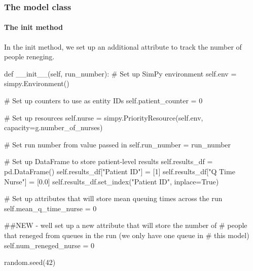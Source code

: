 \documentclass[
  letterpaper,
  DIV=11,
  numbers=noendperiod]{scrreprt}
\let\oldparagraph\paragraph
\renewcommand{\paragraph}[1]{\oldparagraph{#1}\mbox{}}
\newenvironment{Shaded}{}{}
\newcommand{\CommentTok}[1]{\textcolor[rgb]{0.42,0.45,0.49}{#1}}
\newcommand{\DecValTok}[1]{\textcolor[rgb]{0.00,0.36,0.77}{#1}}
\newcommand{\FloatTok}[1]{\textcolor[rgb]{0.00,0.36,0.77}{#1}}
\newcommand{\FunctionTok}[1]{\textcolor[rgb]{0.44,0.26,0.76}{#1}}
\newcommand{\KeywordTok}[1]{\textcolor[rgb]{0.84,0.23,0.29}{#1}}
\newcommand{\NormalTok}[1]{\textcolor[rgb]{0.14,0.16,0.18}{#1}}
\newcommand{\OperatorTok}[1]{\textcolor[rgb]{0.14,0.16,0.18}{#1}}
\newcommand{\StringTok}[1]{\textcolor[rgb]{0.01,0.18,0.38}{#1}}
\newcommand{\VariableTok}[1]{\textcolor[rgb]{0.89,0.38,0.04}{#1}}
\begin{document}
\subsubsection{The model class}\label{the-model-class-5}

\paragraph{\texorpdfstring{The \textbf{init}
method}{The init method}}\label{the-init-method-2}

In the init method, we set up an additional attribute to track the
number of people reneging.

\begin{Shaded}
\begin{Highlighting}[]
\KeywordTok{def} \FunctionTok{\_\_init\_\_}\NormalTok{(}\VariableTok{self}\NormalTok{, run\_number):}
    \CommentTok{\# Set up SimPy environment}
    \VariableTok{self}\NormalTok{.env }\OperatorTok{=}\NormalTok{ simpy.Environment()}

    \CommentTok{\# Set up counters to use as entity IDs}
    \VariableTok{self}\NormalTok{.patient\_counter }\OperatorTok{=} \DecValTok{0}

    \CommentTok{\# Set up resources}
    \VariableTok{self}\NormalTok{.nurse }\OperatorTok{=}\NormalTok{ simpy.PriorityResource(}\VariableTok{self}\NormalTok{.env,}
\NormalTok{                                        capacity}\OperatorTok{=}\NormalTok{g.number\_of\_nurses)}

    \CommentTok{\# Set run number from value passed in}
    \VariableTok{self}\NormalTok{.run\_number }\OperatorTok{=}\NormalTok{ run\_number}

    \CommentTok{\# Set up DataFrame to store patient{-}level results}
    \VariableTok{self}\NormalTok{.results\_df }\OperatorTok{=}\NormalTok{ pd.DataFrame()}
    \VariableTok{self}\NormalTok{.results\_df[}\StringTok{"Patient ID"}\NormalTok{] }\OperatorTok{=}\NormalTok{ [}\DecValTok{1}\NormalTok{]}
    \VariableTok{self}\NormalTok{.results\_df[}\StringTok{"Q Time Nurse"}\NormalTok{] }\OperatorTok{=}\NormalTok{ [}\FloatTok{0.0}\NormalTok{]}
    \VariableTok{self}\NormalTok{.results\_df.set\_index(}\StringTok{"Patient ID"}\NormalTok{, inplace}\OperatorTok{=}\VariableTok{True}\NormalTok{)}

    \CommentTok{\# Set up attributes that will store mean queuing times across the run}
    \VariableTok{self}\NormalTok{.mean\_q\_time\_nurse }\OperatorTok{=} \DecValTok{0}

    \CommentTok{\#\#NEW {-} we\textquotesingle{}ll set up a new attribute that will store the number of}
    \CommentTok{\# people that reneged from queues in the run (we only have one queue in}
    \CommentTok{\# this model)}
    \VariableTok{self}\NormalTok{.num\_reneged\_nurse }\OperatorTok{=} \DecValTok{0}

\NormalTok{    random.seed(}\DecValTok{42}\NormalTok{)}
\end{Highlighting}
\end{Shaded}
\end{document}
